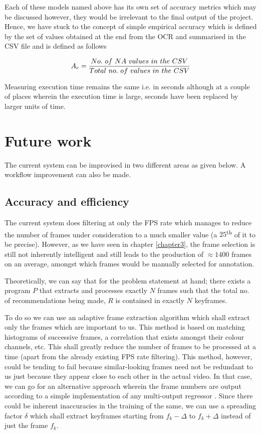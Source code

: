 Each of these models named above has its own set of accuracy metrics which may be discussed however, they would be irrelevant to the final output of the project. Hence, we have stuck to the concept of simple empirical accuracy which is defined by the set of values obtained at the end from the OCR and summarised in the CSV file and is defined as follows

\begin{equation}
\centering
A_{e} = \frac{No. \ of  \ NA \ values \ in \ the \ CSV}{Total \ no. \ of \ values \ in \ the \ CSV }

\end{equation}

Measuring execution time remains the same i.e. in seconds although at a couple of places wherein the execution time is large, seconds have been replaced by larger units of time.
\section{Future work}

The current system can be improvised in two different areas as given below. A workflow improvement can also be made.

\subsection{Accuracy and efficiency}

The current system does filtering at only the FPS rate which manages to reduce the number of frames under consideration to a much smaller value (a $25$\textsuperscript{th} of it to be precise). However, as we have seen in chapter \ref{chapter3}, the frame selection is still not inherently intelligent and still leads to the production of  $ \approx 1400$ frames on an average, amongst which frames would be manually selected for annotation. \par

Theoretically, we can say that for the problem statement at hand; there exists a program $P$ that extracts and processes exactly $N$ frames such that the total no. of recommendations being made, $R$ is contained in exactly $N$ keyframes. \par

To do so we can use an adaptive frame extraction algorithm \cite{adapt} which shall extract only the frames which are important to us. This method is based on matching histograms of successive frames, a correlation that exists amongst their colour channels, etc. This shall greatly reduce the number of frames to be processed at a time (apart from the already existing FPS rate filtering). This method, however, could be tending to fail because similar-looking frames need not be redundant to us just because they appear close to each other in the actual video. In that case, we can go for an alternative approach wherein the frame numbers are output according to a simple implementation of any multi-output regressor \cite{Brownlee2020}. Since there could be inherent inaccuracies in the training of the same, we can use a spreading factor $\delta$ which shall extract keyframes starting from ${f}_{k} - \Delta$ to ${f}_{k} + \Delta$ instead of just the frame $f_k$.

